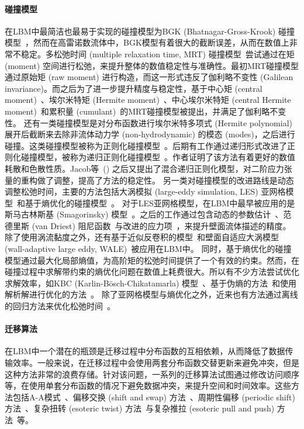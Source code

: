 \paragraph{碰撞模型}
在LBM中最简洁也最易于实现的碰撞模型为BGK (Bhatnagar-Gross-Krook) 碰撞模型~\cite{Chen-1998, Bhatnagar-1954}，然而在高雷诺数流体中，BGK模型有着很大的截断误差，从而在数值上非常不稳定。多松弛时间 (multiple relaxation time, MRT) 碰撞模型~\cite{Coveney-2002, Lallemand-2000, dHumieres-1992}尝试通过在矩 (moment) 空间进行松弛，来提升整体的数值稳定性与准确性。最初MRT碰撞模型通过原始矩 (raw moment) 进行构造，而这一形式违反了伽利略不变性 (Galilean invariance)。而之后为了进一步提升精度与稳定性，基于中心矩 (central moment)~\cite{Geier-2006, Geier-2009}、埃尔米特矩 (Hermite moment)~\cite{Shan-2007, Chen-2014, Adhikari-2008}、中心埃尔米特矩 (central Hermite moment)~\cite{Mattila-2017, Shan-2019}和累积量 (cumulant)~\cite{Geier-2015, Geier-2017}的MRT碰撞模型被提出，并满足了伽利略不变性。
还有一类碰撞模型是对分布函数进行埃尔米特多项式 (Hermite polynomial) 展开后截断来去除非流体动力学 (non-hydrodynamic) 的模态 (modes)，之后进行碰撞。这类碰撞模型被称为正则化碰撞模型~\cite{Zhang-2006, Latt-2006}。后期有工作通过递归形式改进了正则化碰撞模型，被称为递归正则化碰撞模型~\cite{Malaspinas-2015, Coreixas-2017}。作者证明了该方法有着更好的数值耗散和色散性质。Jacob等~(\citeyear{Jacob-2018}) 之后又提出了混合递归正则化模型，对二阶应力张量的重构做了调整，提高了方法的稳定性。
另一类对碰撞模型的改进路线是动态调整松弛时间，主要的方法包括大涡模拟 (large-eddy simulation, LES) 亚网格模型~\cite{Eggels-1996, Sagaut-2010}和基于熵优化的碰撞模型~\cite{Karlin-1999, Ansumali-2003}。
对于LES亚网格模型，在LBM中最早被应用的是斯马古林斯基 (Smagorinsky) 模型~\cite{Hou-1994, Krafczyk-2003}。之后的工作通过包含动态的参数估计~\cite{Premnath-2009}、范德里斯 (van Driest) 阻尼函数~\cite{Malaspinas-2014}与改进的应力项~\cite{Leveque-2007}，来提升壁面流体描述的精度。
除了使用涡流黏度之外，还有基于近似反卷积的模型~\cite{Malaspinas-2011, Nathen-2018}和壁面自适应大涡模型 (wall-adaptive large eddy, WALE)~\cite{Weickert-2010}被应用在LBM中。
同时，基于熵优化的碰撞模型通过最大化局部熵值，为高阶矩的松弛时间提供了一个有效的约束。然而，在碰撞过程中求解带约束的熵优化问题在数值上耗费很大。所以有不少方法尝试优化求解效率，如KBC (Karlin-B\"osch-Chikatamarla) 模型~\cite{Karlin-2014}、基于伪熵的方法~\cite{Kramer-2019}和使用解析解进行优化的方法~\cite{Tang-2022}。
除了亚网格模型与熵优化之外，近来也有方法通过离线的回归方法来优化松弛时间~\cite{Li-2020}。

\paragraph{迁移算法}
在LBM中一个潜在的瓶颈是迁移过程中分布函数的互相依赖，从而降低了数据传输效率。一般来说，在迁移过程中会使用两套分布函数交替更新来避免冲突，但是这种方法非常的浪费存储。针对该问题，一系列的迁移算法试图通过修改访问顺序等，在使用单套分布函数的情况下避免数据冲突，来提升空间和时间效率。这些方法包括A-A模式~\citet{Bailey-2009}、偏移交换 (shift and swap) 方法~\cite{Mohrhard-2019}、周期性偏移 (periodic shift) 方法~\cite{Adrian-2023}、复杂扭转 (esoteric twist) 方法~\cite{Geier-2017-c}与复杂推拉 (esoteric pull and push) 方法~\cite{Moritz-2022}等。

